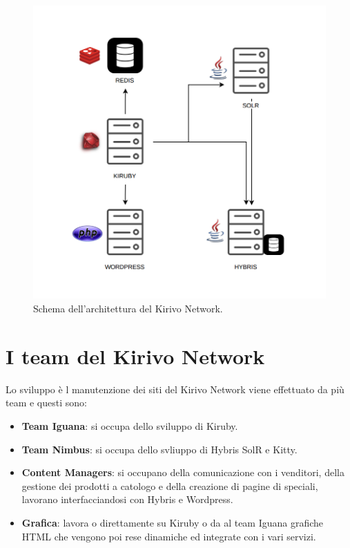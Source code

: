 \begin{figure}
  \includegraphics[width=\textwidth]{figure/arch.png}
  \caption{Schema dell'architettura del Kirivo Network.}
  \label{fig:kn}
\end{figure}


\newpage

\section{I team del Kirivo Network}
Lo sviluppo è l manutenzione dei siti del Kirivo Network viene effettuato da più team e questi sono:
\begin{itemize}
\item {\bf Team Iguana}: si occupa dello sviluppo di Kiruby.
\item {\bf Team Nimbus}: si occupa dello svliuppo di Hybris SolR e Kitty.
\item {\bf Content Managers}: si occupano della comunicazione con i venditori, della gestione dei prodotti a catologo
 e della creazione di pagine di speciali, lavorano interfacciandosi con Hybris e Wordpress.
\item {\bf Grafica}: lavora o direttamente su Kiruby o da al team Iguana grafiche HTML che vengono poi rese dinamiche 
ed integrate con i vari servizi.
\end{itemize}


